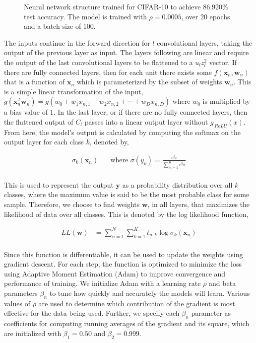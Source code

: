 \documentclass[conference]{IEEEtran}
\newcommand{\xv}{\mathbf{x}}
\newcommand{\yv}{\mathbf{y}}
\newcommand{\wv}{\mathbf{w}}
\begin{document}
\begin{figure*}[!t]
	\centering
	
    \captionsetup{width=0.90\linewidth}
	\caption{Neural network structure trained for CIFAR-10 to achieve 86.920\% test accuracy. The model is trained with $\rho = 0.0005$, over 20 epochs and a batch size of 100.}
	\label{fig:cifar_network_structure}
\end{figure*}

The inputs continue in the forward direction for $l$ convolutional layers, taking the output of the previous layer as input. The layers following are linear and require the output of the last convolutional layers to be flattened to a $u_l z_l^2$ vector. If there are fully connected layers, then for each unit there exists some $f(\xv_n, \wv_n)$ that is a function of $\xv_n$ which is parameterized by the subset of weights $\wv_n$. This is a simple linear transformation of the input, $g(\xv_n^T \wv_n) = g(w_0 + w_1 x_{n,1} + w_2 x_{n,2} + \cdots + w_D x_{n,D})$ where $w_0$ is multiplied by a bias value of 1. In the last layer, or if there are no fully connected layers, then the flattened output of $C_l$ passes into a linear output layer without $g_{\,ReLU}(x)$.
\newpage
From here, the model's output is calculated by computing the softmax on the output layer for each class $k$, denoted by,

\begin{align*}
\sigma_k(\xv_n)\;\;\;\;\; 
    \text{ where } \sigma(y_k) = \frac{e^{y_k}}{\sum_{m=1}^K e^{y_m}} \\
\end{align*}

This is used to represent the output $\yv$ as a probability distribution over all $k$ classes, where the maximum value is said to be the most probable class for some sample. Therefore, we choose to find weights $\wv$, in all layers, that maximizes the likelihood of data over all classes. This is denoted by the log likelihood function,

\begin{align*}
      LL(\wv) & = \sum_{n=1}^N \sum_{k=1}^K t_{n,k} \log \sigma_k(\xv_n) \\ 
\end{align*}

Since this function is differentiable, it can be used to update the weights using gradient descent. For each step, the function is optimized to minimize the loss using Adaptive Moment Estimation (Adam) to improve convergence and performance of training. We initialize Adam with a learning rate $\rho$ and beta parameters $\beta_n$ to tune how quickly and accurately the models will learn. Various values of $\rho$ are used to determine which contribution of the gradient is most effective for the data being used. Further, we specify each $\beta_n$ parameter as coefficients for computing running averages of the gradient and its square, which are initialized with $\beta_1 = 0.50$ and $\beta_2 = 0.999$.
\end{document}
